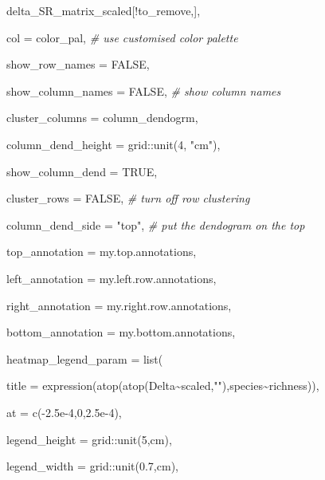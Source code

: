 \documentclass[
]{article}
\newenvironment{Shaded}{\begin{snugshade}}{\end{snugshade}}
\newcommand{\AttributeTok}[1]{\textcolor[rgb]{0.77,0.63,0.00}{#1}}
\newcommand{\CommentTok}[1]{\textcolor[rgb]{0.56,0.35,0.01}{\textit{#1}}}
\newcommand{\ConstantTok}[1]{\textcolor[rgb]{0.00,0.00,0.00}{#1}}
\newcommand{\DecValTok}[1]{\textcolor[rgb]{0.00,0.00,0.81}{#1}}
\newcommand{\FloatTok}[1]{\textcolor[rgb]{0.00,0.00,0.81}{#1}}
\newcommand{\FunctionTok}[1]{\textcolor[rgb]{0.00,0.00,0.00}{#1}}
\newcommand{\NormalTok}[1]{#1}
\newcommand{\SpecialCharTok}[1]{\textcolor[rgb]{0.00,0.00,0.00}{#1}}
\newcommand{\StringTok}[1]{\textcolor[rgb]{0.31,0.60,0.02}{#1}}
\begin{document}
\begin{Shaded}
\begin{Highlighting}[]
\NormalTok{  delta\_SR\_matrix\_scaled[}\SpecialCharTok{!}\NormalTok{to\_remove,],}

  \AttributeTok{col =}\NormalTok{ color\_pal, }\CommentTok{\# use customised color palette}

  \AttributeTok{show\_row\_names =} \ConstantTok{FALSE}\NormalTok{,}

  \AttributeTok{show\_column\_names =} \ConstantTok{FALSE}\NormalTok{, }\CommentTok{\# show column names}

  \AttributeTok{cluster\_columns =}\NormalTok{ column\_dendogrm,}

  \AttributeTok{column\_dend\_height =}\NormalTok{ grid}\SpecialCharTok{::}\FunctionTok{unit}\NormalTok{(}\DecValTok{4}\NormalTok{, }\StringTok{"cm"}\NormalTok{),}

  \AttributeTok{show\_column\_dend =} \ConstantTok{TRUE}\NormalTok{,}

  \AttributeTok{cluster\_rows =} \ConstantTok{FALSE}\NormalTok{, }\CommentTok{\# turn off row clustering}

  \AttributeTok{column\_dend\_side =} \StringTok{"top"}\NormalTok{, }\CommentTok{\# put the dendogram on the top}

  \AttributeTok{top\_annotation =}\NormalTok{ my.top.annotations,}

  \AttributeTok{left\_annotation =}\NormalTok{ my.left.row.annotations,}

  \AttributeTok{right\_annotation =}\NormalTok{ my.right.row.annotations,}

  \AttributeTok{bottom\_annotation =}\NormalTok{ my.bottom.annotations,}

  \AttributeTok{heatmap\_legend\_param =} \FunctionTok{list}\NormalTok{(}

    \AttributeTok{title =} \FunctionTok{expression}\NormalTok{(}\FunctionTok{atop}\NormalTok{(}\FunctionTok{atop}\NormalTok{(Delta}\SpecialCharTok{\textasciitilde{}}\NormalTok{scaled,}\StringTok{""}\NormalTok{),species}\SpecialCharTok{\textasciitilde{}}\NormalTok{richness)),}

    \AttributeTok{at =} \FunctionTok{c}\NormalTok{(}\SpecialCharTok{{-}}\FloatTok{2.5e{-}4}\NormalTok{,}\DecValTok{0}\NormalTok{,}\FloatTok{2.5e{-}4}\NormalTok{),}

    \AttributeTok{legend\_height =}\NormalTok{ grid}\SpecialCharTok{::}\FunctionTok{unit}\NormalTok{(}\DecValTok{5}\NormalTok{,}\StringTok{\textquotesingle{}cm\textquotesingle{}}\NormalTok{),}

    \AttributeTok{legend\_width =}\NormalTok{ grid}\SpecialCharTok{::}\FunctionTok{unit}\NormalTok{(}\FloatTok{0.7}\NormalTok{,}\StringTok{\textquotesingle{}cm\textquotesingle{}}\NormalTok{),}


\end{Highlighting}
\end{Shaded}
\end{document}
